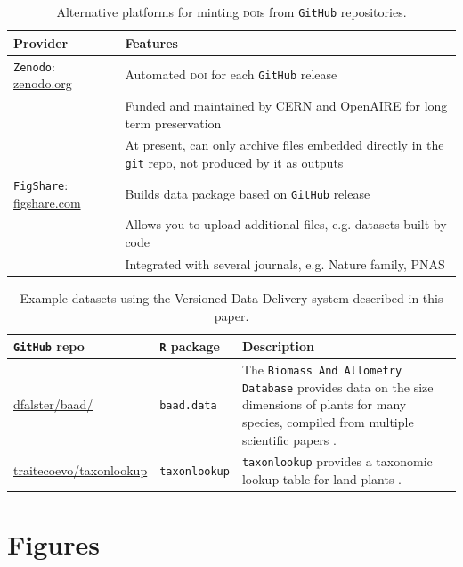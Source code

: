 \documentclass[a4paper,11pt]{article}
\newcommand{\smurl}[1]{{\footnotesize\url{#1}}}
\newcommand{\ghsmurl}[1]{{\footnotesize\href{https://github.com/#1}{#1}}}
\begin{document}
\begin{table}[h!]
\centering
\caption{Alternative platforms for minting \textsc{doi}s from \texttt{GitHub} repositories.}
{\footnotesize
\vspace{1cm}
  \begin{tabular}{p{4cm}p{8cm}}
  \hline
  \textbf{Provider} & \textbf{Features} \\ \hline
  \texttt{Zenodo}: \smurl{zenodo.org} & Automated \textsc{doi} for each \texttt{GitHub} release \\
    & Funded and maintained by CERN and OpenAIRE for long term preservation \\
    & At present, can only archive files embedded directly in the \texttt{git} repo, not produced by it as outputs\\
  \texttt{FigShare}: \smurl{figshare.com} & Builds data package based on \texttt{GitHub} release \\
    & Allows you to upload additional files, e.g. datasets built by code \\
    & Integrated with several journals, e.g. Nature family, \textsc{PNAS} \\
  \hline
  \end{tabular}
  }
\label{tab:doi_minting}
\end{table}

\newpage

\begin{table}[h!]
\centering
\caption{Example datasets using the Versioned Data Delivery system described in this paper.}
{\footnotesize
\vspace{1cm}

  \begin{tabular}{p{3.5cm}p{3cm}p{7cm}}
  \hline
   \textbf{\texttt{GitHub} repo} & \textbf{\texttt{R} package} & \textbf{Description} \\ \hline
  \ghsmurl{dfalster/baad/} & \texttt{baad.data} & The \texttt{Biomass And Allometry Database} provides data on the size dimensions of plants for many species, compiled from multiple scientific papers \citep{Falster-2015}.\\
  \ghsmurl{traitecoevo/taxonlookup} & \texttt{taxonlookup} & \texttt{taxonlookup} provides a taxonomic lookup table for land plants \citep{Pennell-2015a}.\\
  \hline
  \end{tabular}
  }
\label{tab:examples}
\end{table}

\newpage
\section{Figures}
\end{document}
